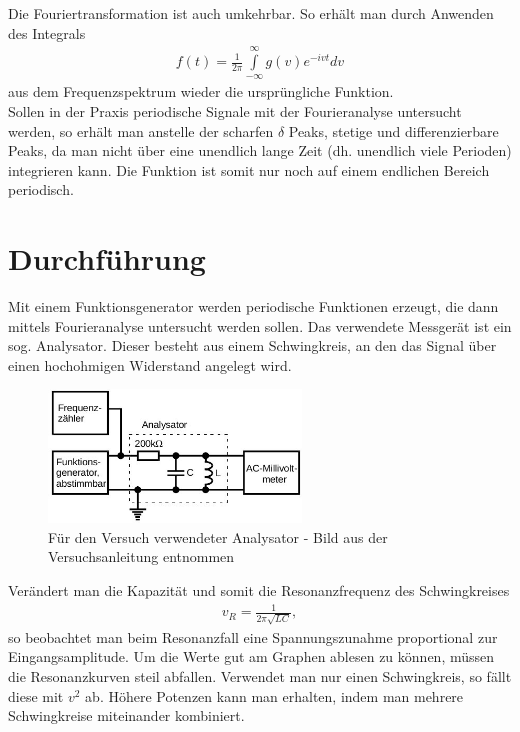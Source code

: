 Die Fouriertransformation ist auch umkehrbar. So erhält man durch Anwenden des Integrals
\begin{align}
f(t) = \frac{1}{2\pi} \int \limits ^\infty _{-\infty} g(v) e^{-ivt} dv
\label{eq-ruecktrafo}
\end{align}
aus dem Frequenzspektrum wieder die ursprüngliche Funktion.\\

Sollen in der Praxis periodische Signale mit der Fourieranalyse untersucht werden, so erhält man anstelle der scharfen $\delta$ Peaks, stetige und differenzierbare Peaks, da man nicht über eine unendlich lange Zeit (dh. unendlich viele Perioden) integrieren kann. Die Funktion ist somit nur noch auf einem endlichen Bereich periodisch. 

\section{Durchführung}
Mit einem Funktionsgenerator werden periodische Funktionen erzeugt, die dann mittels Fourieranalyse untersucht werden sollen. Das verwendete Messgerät ist ein sog. Analysator. Dieser besteht aus einem Schwingkreis, an den das Signal über einen hochohmigen Widerstand angelegt wird. 
\begin{figure}[htbp]
\includegraphics[width=0.6\textwidth]{pics/analysator.jpeg}
\caption{Für den Versuch verwendeter Analysator - Bild aus der Versuchsanleitung entnommen}
\end{figure}

Verändert man die Kapazität und somit die Resonanzfrequenz des Schwingkreises
\begin{align}
v_R=\frac{1}{2\pi\sqrt{LC}},
\end{align}
so beobachtet man beim Resonanzfall eine Spannungszunahme proportional zur Eingangsamplitude. Um die Werte gut am Graphen ablesen zu können, müssen die Resonanzkurven steil abfallen. Verwendet man nur einen Schwingkreis, so fällt diese mit $v^2$ ab. Höhere Potenzen kann man erhalten, indem man mehrere Schwingkreise miteinander kombiniert.

